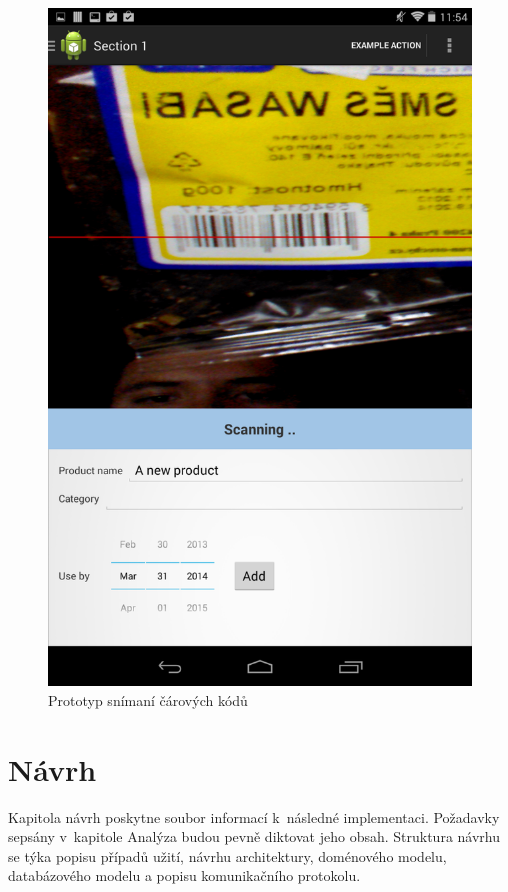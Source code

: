 \documentclass[thesis=B,czech]{FITthesis}[2013/10/20]
\begin{document}
\begin{figure}[H]
  \centering
  \includegraphics[scale=0.3]{screenshots/scan_prototype.png}
  \caption{Prototyp snímaní čárových kódů}
  \label{fig:ScanPrototype}
\end{figure}


\chapter{Návrh}

Kapitola návrh poskytne soubor informací k~následné implementaci. Požadavky sepsány v~kapitole Analýza budou pevně diktovat jeho obsah. Struktura návrhu se týka popisu případů užití, návrhu architektury, doménového modelu, databázového modelu a popisu komunikačního protokolu.
\end{document}
